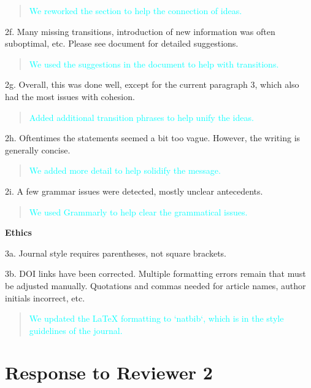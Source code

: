 \documentclass[
  12pt,
  letterpaper,
  DIV=11,
  numbers=noendperiod]{scrartcl}
\begin{document}
\begin{quote}
\textcolor{cyan}{We reworked the section to help the connection of ideas.}
\end{quote}

2f. Many missing transitions, introduction of new information was often
suboptimal, etc. Please see document for detailed suggestions.

\begin{quote}
\textcolor{cyan}{We used the suggestions in the document to help with transitions.}
\end{quote}

2g. Overall, this was done well, except for the current paragraph 3,
which also had the most issues with cohesion.

\begin{quote}
\textcolor{cyan}{Added additional transition phrases to help unify the ideas.}
\end{quote}

2h. Oftentimes the statements seemed a bit too vague. However, the
writing is generally concise.

\begin{quote}
\textcolor{cyan}{We added more detail to help solidify the message.}
\end{quote}

2i. A few grammar issues were detected, mostly unclear antecedents.

\begin{quote}
\textcolor{cyan}{We used Grammarly to help clear the grammatical issues.}
\end{quote}

\textbf{Ethics}

3a. Journal style requires parentheses, not square brackets.

3b. DOI links have been corrected. Multiple formatting errors remain
that must be adjusted manually. Quotations and commas needed for article
names, author initials incorrect, etc.

\begin{quote}
\textcolor{cyan}{We updated the LaTeX formatting to `natbib`, which is in the style guidelines of the journal.}
\end{quote}

\newpage

\section{Response to Reviewer 2}\label{response-to-reviewer-2}
\end{document}
